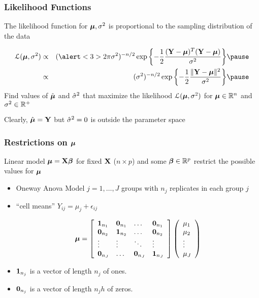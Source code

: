 \documentclass{beamer}
\begin{document}
\begin{frame} \frametitle{Likelihood Functions}

The likelihood function for $\boldsymbol{\mu}, \sigma^2$ is proportional to the
sampling distribution of the data \pause

\begin{eqnarray*}
 \cL(\mub, \sigma^2) & \propto & (\alert<3>{2 \pi} \sigma^2)^{-n/2} 
 \exp{\left\{ - \frac 1 2 \frac{(\Y - \mub)^T (\Y - \mub)}{\sigma^2} 
\right\}}  \pause \\
   & \propto & (\sigma^2)^{-n/2} 
 \exp{\left\{ - \frac 1 2 \frac{\| \Y - \mub \|^2}{\sigma^2} 
\right\}}  \pause
\end{eqnarray*}
Find values of $\hat{\boldsymbol{\mu}}$ and ${\hat{\sigma}}^2$ that maximize the likelihood
${\cal{L}}(\boldsymbol{\mu}, \sigma^2)$ for $\boldsymbol{\mu} \in \mathbb{R}^n$ and $\sigma^2 \in \mathbb{R}^+$
\pause

\vspace{18pt}
Clearly, $\hat{\boldsymbol{\mu}} = \mathbf{Y}$ but ${\hat{\sigma}}^2 = 0$  is outside the parameter space
\end{frame}
\begin{frame}
  \frametitle{Restrictions on $\boldsymbol{\mu}$}
Linear model $\boldsymbol{\mu} = \mathbf{X} \boldsymbol{\beta}$ for fixed $\mathbf{X}$ ($n \times p$) and some $\boldsymbol{\beta}
\in \mathbb{R}^p$  restrict the possible values for $\boldsymbol{\mu}$  \pause

\begin{itemize}
\item  Oneway Anova Model  $j = 1, \ldots, J$ groups with $n_j$
  replicates in each group $j$ \pause
\item {``cell  means'' $Y_{ij} = \mu_j + \epsilon_{ij}$ }


$$\boldsymbol{\mu} = {\left[
  \begin{array}{llll}
    \mathbf{1}_{n_1} & \mathbf{0}_{n_1} & \ldots & \mathbf{0}_{n_1} \\
    \mathbf{0}_{n_2} & \mathbf{1}_{n_2} & \ldots & \mathbf{0}_{n_2} \\
    \vdots & \vdots & \ddots & \vdots \\
    \mathbf{0}_{n_J} & \ldots & \mathbf{0}_{n_J} & \mathbf{1}_{n_J} \\
  \end{array}
   \right] \left(
     \begin{array}{l}
\mu_1 \\ \mu_2 \\ \vdots \\ \mu_J 
    \end{array}
\right) }$$
\item $\mathbf{1}_{n_j}$ is a vector of length $n_j$ of ones. 
\item  $\mathbf{0}_{n_j}$ is a vector of length $n_jh$ of zeros.
\end{itemize}

\end{frame}
\end{document}
